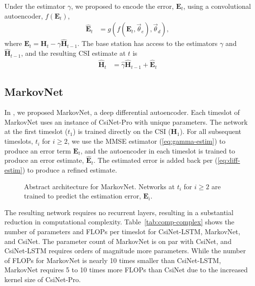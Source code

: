 Under the estimator $\gamma$, we proposed to encode the error, $\mathbf E_t$, using a convolutional autoencoder, $f(\mathbf E_t)$,
\begin{align*}
	\hat{\mathbf E}_t &= g(f(\mathbf E_t, \vec\theta_e), \vec\theta_d),
\end{align*}
where $\mathbf E_t = \mathbf H_t - \gamma\hat{\mathbf H}_{t-1}$. The base station has access to the estimators $\gamma$ and $\hat{\mathbf H}_{t-1}$, and the resulting CSI estimate at $t$ is
\begin{align}
	\hat{\mathbf H}_t &= \hat\gamma \hat{\mathbf H}_{t-1} + \hat{\mathbf{E}}_t \label{eq:diff-estim}
\end{align}

\subsection{MarkovNet}

In \cite{ref:Liu2020MarkovNet}, we proposed MarkovNet, a deep differential autoencoder. Each timeslot of MarkovNet uses an instance of CsiNet-Pro with unique parameters. The network at the first timeslot ($t_1$) is trained directly on the CSI ($\mathbf H_1$). For all subsequent timeslots, $t_i$ for $i \geq 2$, we use the MMSE estimator (\ref{eq:gamma-estim}) to produce an error term $\mathbf E_t$, and the autoencoder in each timeslot is trained to produce an error estimate, $\hat{\mathbf E}_t$. The estimated error is added back per (\ref{eq:diff-estim}) to produce a refined estimate.

\begin{figure}[!hbtp]
    \centering
    {
      \fontsize{6pt}{8pt}
      \def\svgwidth{0.8\columnwidth}
      
    }
    \caption{Abstract architecture for MarkovNet. Networks at $t_i$ for $i \geq 2$ are trained to predict the estimation error, $\mathbf E_i$.}
    \label{fig:markovnet_schema}
\end{figure}

The resulting network requires no recurrent layers, resulting in a substantial reduction in computational complexity. Table~\ref{tab:comp-complex} shows the number of parameters and FLOPs per timeslot for CsiNet-LSTM, MarkovNet, and CsiNet. The parameter count of MarkovNet is on par with CsiNet, and CsiNet-LSTM requires orders of magnitude more parameters. While the number of FLOPs for MarkovNet is nearly 10 times smaller than CsiNet-LSTM, MarkovNet requires 5 to 10 times more FLOPs than CsiNet due to the increased kernel size of CsiNet-Pro.

